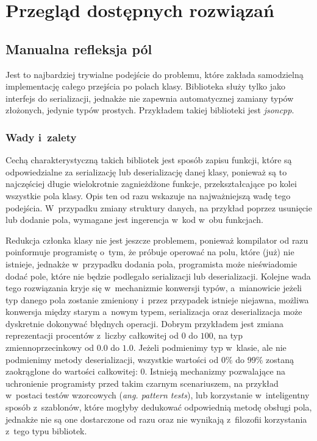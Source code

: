 \documentclass[12pt]{article}
\newcommand{\n}{\newline}
\newcommand{\nonpl}[1]{{\it #1}}
\newcommand{\ang}[1]{\nonpl{ang. #1}}
\begin{document}
	{
		\section{Przegląd dostępnych rozwiązań}

		{
			\subsection{Manualna refleksja pól}

			Jest to najbardziej trywialne podejście do problemu, które zakłada samodzielną implementację całego przejścia
			po polach klasy. Biblioteka służy tylko jako interfejs do serializacji, jednakże nie zapewnia automatycznej
			zamiany typów złożonych, jedynie typów prostych. Przykładem takiej biblioteki jest \nonpl{jsoncpp}\cite{jsoncpp_repo}.\n

			{
				\subsubsection{Wady i~zalety}

				Cechą charakterystyczną takich bibliotek jest sposób zapisu funkcji, które są odpowiedzialne za serializację lub deserializację
				danej klasy, ponieważ są to najczęściej długie wielokrotnie zagnieżdżone funkcje, przekształcające po kolei wszystkie pola klasy.
				Opis ten od razu wskazuje na najważniejszą wadę tego podejścia. W~przypadku zmiany struktury danych, na przykład poprzez usunięcie
				lub dodanie pola, wymagane jest ingerencja w~kod w~obu funkcjach.\n

				Redukcja członka klasy nie jest jeszcze problemem, ponieważ kompilator od razu poinformuje programistę o~tym, że próbuje operować na polu,
				które (już) nie istnieje, jednakże w~przypadku dodania pola, programista może nieświadomie dodać pole, które nie będzie podlegało serializacji
				lub deserializacji. Kolejne wada tego rozwiązania kryje się w~mechanizmie konwersji typów, a~mianowicie jeżeli typ danego pola zostanie
				zmieniony i~przez przypadek istnieje niejawna, możliwa konwersja między starym a~nowym typem, serializacja oraz deserializacja może
				dyskretnie dokonywać błędnych operacji. Dobrym przykładem jest zmiana reprezentacji procentów z~liczby całkowitej od $0$ do $100$,
				na typ zmiennoprzecinkowy od $0.0$ do $1.0$. Jeżeli podmienimy typ w~klasie, ale nie podmienimy metody deserializacji, wszystkie wartości
				od $0\%$ do $99\%$ zostaną zaokrąglone do wartości całkowitej: $0$. Istnieją mechanizmy pozwalające na uchronienie programisty przed takim
				czarnym scenariuszem, na przykład w~postaci testów wzorcowych (\ang{pattern tests}), lub korzystanie w~inteligentny sposób z~szablonów,
				które mogłyby dedukować odpowiednią metodę obsługi pola, jednakże nie są one dostarczone od razu oraz nie wynikają z~filozofii
				korzystania z~tego typu bibliotek.\n

}}}
\end{document}
